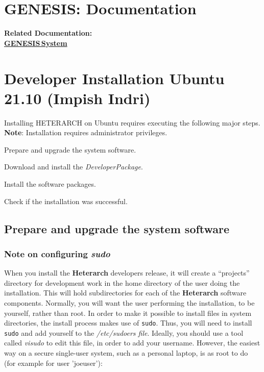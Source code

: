 \documentclass[12pt]{article}
\begin{document}
\section*{GENESIS: Documentation}

{\bf Related Documentation:} \\
\href{../genesis-system/genesis-system.tex}{\bf GENESIS\,System}

\section*{Developer Installation Ubuntu 21.10 (Impish Indri)}

Installing HETERARCH on Ubuntu requires executing the following major steps. {\bf Note}: Installation requires administrator privileges.
\begin{description} 
   \item Prepare and upgrade the system software.
   \item Download and install the {\it DeveloperPackage}.
   \item Install the software packages.
   \item Check if the installation was successful. 
\end{description}

\subsection*{Prepare and upgrade the system software}

\subsubsection*{Note on configuring {\emph{sudo}}}

When you install the {\bf \small{Heterarch}} developers release, it
will create a ``projects'' directory for development work in the home
directory of the user doing the installation.  This will hold
subdirectories for each of the {\bf \small Heterarch} software
components.  Normally, you will want the user performing the
installation, to be yourself, rather than root.  In order to make it
possible to install files in system directories, the install process
makes use of {\tt sudo}.  Thus, you will need to install {\tt sudo}
and add yourself to the {\it /etc/sudoers file}.  Ideally, you should
use a tool called {\it visudo} to edit this file, in order to add your
username.  However, the easiest way on a secure single-user system,
such as a personal laptop, is as root to do (for example for user
'joeuser'):
\end{document}
